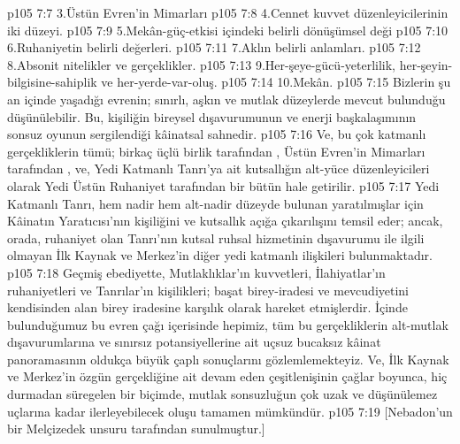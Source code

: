 \vs p105 7:7 3.\bibnobreakspace Üstün Evren’in Mimarları
\vs p105 7:8 4.\bibnobreakspace Cennet kuvvet düzenleyicilerinin iki düzeyi.
\vs p105 7:9 5.\bibnobreakspace Mekân\hyp{}güç\hyp{}etkisi içindeki belirli dönüşümsel deği
\vs p105 7:10 6.\bibnobreakspace Ruhaniyetin belirli değerleri.
\vs p105 7:11 7.\bibnobreakspace Aklın belirli anlamları.
\vs p105 7:12 8.\bibnobreakspace Absonit nitelikler ve gerçeklikler.
\vs p105 7:13 9.\bibnobreakspace Her\hyp{}şeye\hyp{}gücü\hyp{}yeterlilik, her\hyp{}şeyin\hyp{}bilgisine\hyp{}sahiplik ve her\hyp{}yerde\hyp{}var\hyp{}oluş.
\vs p105 7:14 10.\bibnobreakspace Mekân.
\vs p105 7:15 Bizlerin şu an içinde yaşadığı evrenin; sınırlı, aşkın ve mutlak düzeylerde mevcut bulunduğu düşünülebilir. Bu, kişiliğin bireysel dışavurumunun ve enerji başkalaşımının sonsuz oyunun sergilendiği kâinatsal sahnedir.
\vs p105 7:16 Ve, bu çok katmanlı gerçekliklerin tümü; birkaç üçlü birlik tarafından , Üstün Evren’in Mimarları tarafından , ve, Yedi Katmanlı Tanrı’ya ait kutsallığın alt\hyp{}yüce düzenleyicileri olarak Yedi Üstün Ruhaniyet tarafından  bir bütün hale getirilir.
\vs p105 7:17 Yedi Katmanlı Tanrı, hem nadir hem alt\hyp{}nadir düzeyde bulunan yaratılmışlar için Kâinatın Yaratıcısı’nın kişiliğini ve kutsallık açığa çıkarılışını temsil eder; ancak, orada, ruhaniyet olan Tanrı’nın kutsal ruhsal hizmetinin dışavurumu ile ilgili olmayan İlk Kaynak ve Merkez’in diğer yedi katmanlı ilişkileri bulunmaktadır.
\vs p105 7:18 Geçmiş ebediyette, Mutlaklıklar’ın kuvvetleri, İlahiyatlar’ın ruhaniyetleri ve Tanrılar’ın kişilikleri; başat birey\hyp{}iradesi ve mevcudiyetini kendisinden alan birey iradesine karşılık olarak hareket etmişlerdir. İçinde bulunduğumuz bu evren çağı içerisinde hepimiz, tüm bu gerçekliklerin alt\hyp{}mutlak dışavurumlarına ve sınırsız potansiyellerine ait uçsuz bucaksız kâinat panoramasının oldukça büyük çaplı sonuçlarını gözlemlemekteyiz. Ve, İlk Kaynak ve Merkez’in özgün gerçekliğine ait devam eden çeşitlenişinin çağlar boyunca, hiç durmadan süregelen bir biçimde, mutlak sonsuzluğun çok uzak ve düşünülemez uçlarına kadar ilerleyebilecek oluşu tamamen mümkündür.
\vs p105 7:19 [Nebadon’un bir Melçizedek unsuru tarafından sunulmuştur.]
